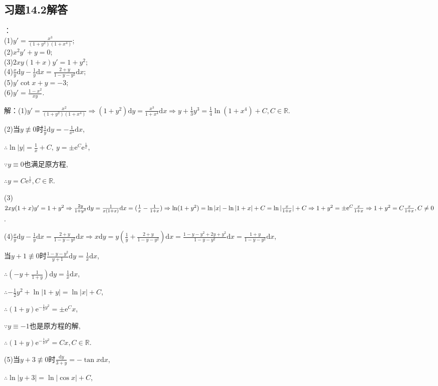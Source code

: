 \documentclass[12pt,UTF8,fleqn]{ctexart}
\newcommand{\me}[0]{\mathrm e}
\begin{document}
\subsection{习题14.2解答}
\begin{enumerate}
：\\
(1)$y'=\frac{x^3}{(1+y^2)(1+x^4)}$;\\
(2)$x^2y'+y=0$;\\
(3)$2xy(1+x)y'=1+y^2$;\\
(4)$\frac xy\mathrm dy-\frac1y\mathrm dx=\frac{2+y}{1-y-y^2}\mathrm dx$;\\
(5)$y'\cot x+y=-3$;\\
(6)$y'=\frac{1-x^2}{xy}$.

解：(1)$y'=\frac{x^2}{(1+y^2)(1+x^4)}\Rightarrow(1+y^2)\mathrm dy=\frac{x^3}{1+x^4}\mathrm dx\Rightarrow y+\frac13y^3=\frac14\ln(1+x^4)+C,C\in\mathbb R$.

(2)当$y\not\equiv0$时$\frac1y\mathrm dy=-\frac1{x^2}\mathrm dx$,

$\therefore\ln|y|=\frac1x+C,\ y=\pm\me^C\me^{\frac1x}$,

$\because y\equiv0$也满足原方程,

$\therefore y=C\me^{\frac1x},C\in\mathbb R$.

(3)$2xy(1+x)y'=1+y^2\Rightarrow\frac{2y}{1+y^2}\mathrm dy=\frac1{x(1+x)}\mathrm dx=(\frac1x-\frac1{1+x})\\ 
\Rightarrow\ln(1+y^2)=\ln|x|-\ln|1+x|+C=\ln|\frac x{1+x}|+C\Rightarrow1+y^2=\pm\me^C\frac x{1+x}\\
\Rightarrow1+y^2=C\frac x{1+x},C\neq0$.

(4)$\frac xy\mathrm dy-\frac1y\mathrm dx=\frac{2+y}{1-y-y^2}\mathrm dx\Rightarrow x\mathrm dy=y(\frac1y+\frac{2+y}{1-y-y^2})\mathrm dx=\frac{1-y-y^2+2y+y^2}{1-y-y^2}\mathrm dx=\frac{1+y}{1-y-y^2}\mathrm dx$,

当$y+1\not\equiv0$时$\frac{1-y-y^2}{y+1}\mathrm dy=\frac1x\mathrm dx$,

$\therefore(-y+\frac1{1+y})\mathrm dy=\frac1x\mathrm dx$,

$\therefore -\frac12y^2+\ln|1+y|=\ln|x|+C$,

$\therefore (1+y)\me^{-\frac12y^2}=\pm\me^Cx$,

$\because y\equiv-1$也是原方程的解,

$\therefore(1+y)\me^{-\frac12y^2}=Cx,C\in\mathbb R$.

(5)当$y+3\not\equiv0$时$\frac{\mathrm dy}{3+y}=-\tan x\mathrm dx$,

$\therefore\ln|y+3|=\ln|\cos x|+C$,


\end{enumerate}
\end{document}

